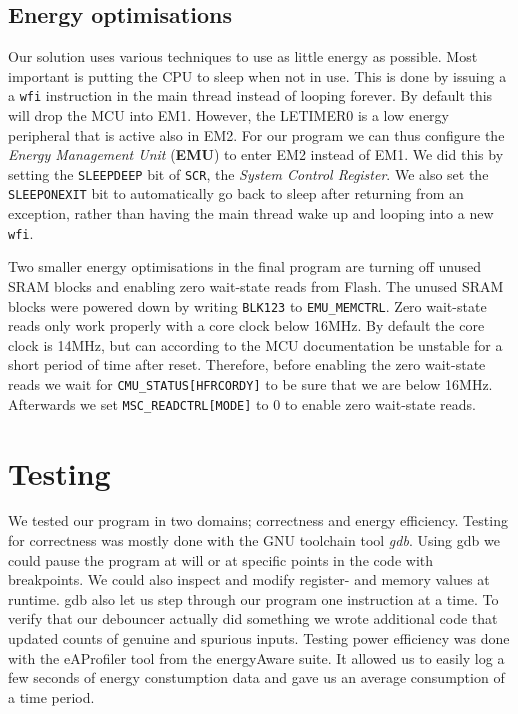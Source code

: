 \subsection{Energy optimisations}

Our solution uses various techniques to use as little energy as possible. Most
important is putting the CPU to sleep when not in use. This is done by issuing a
a {\tt wfi} instruction in the main thread instead of looping forever. By
default this will drop the MCU into EM1. However, the LETIMER0 is a low energy
peripheral that is active also in EM2. For our program we can thus configure the
\emph{Energy Management Unit} (\textbf{EMU}) to enter EM2 instead of EM1. We did
this by setting the {\tt SLEEPDEEP} bit of {\tt SCR}, the \emph{System Control
Register}. We also set the {\tt SLEEPONEXIT} bit to automatically go back to
sleep after returning from an exception, rather than having the main thread wake
up and looping into a new {\tt wfi}.

Two smaller energy optimisations in the final program are turning off unused
SRAM blocks and enabling zero wait-state reads from Flash. The unused SRAM
blocks were powered down by writing {\tt BLK123} to {\tt EMU\_MEMCTRL}. Zero
wait-state reads only work properly with a core clock below 16MHz. By default
the core clock is 14MHz, but can according to the MCU documentation be unstable
for a short period of time after reset. Therefore, before enabling the zero
wait-state reads we wait for {\tt CMU\_STATUS[HFRCORDY]} to be sure that we are
below 16MHz. Afterwards we set {\tt MSC\_READCTRL[MODE]} to 0 to enable zero
wait-state reads.

\section{Testing}

We tested our program in two domains; correctness and energy efficiency. Testing
for correctness was mostly done with the GNU toolchain tool \emph{gdb}. Using
gdb we could pause the program at will or at specific points in the code with
breakpoints. We could also inspect and modify register- and memory values at
runtime. gdb also let us step through our program one instruction at a time. To
verify that our debouncer actually did something we wrote additional code that
updated counts of genuine and spurious inputs. Testing power efficiency was done
with the eAProfiler tool from the energyAware suite. It allowed us to easily log
a few seconds of energy constumption data and gave us an average consumption of
a time period.
